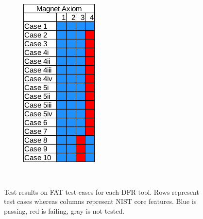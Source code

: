 \begin{figure}[h!]
\begin{subfigure}{0.17\linewidth}
    \end{subfigure}~~
    \begin{subfigure}{0.17\linewidth}
        \includegraphics[width=\linewidth]{fig/axiom_results_fat.png}
    \end{subfigure}~~
        
    \caption{Test results on FAT test cases for each DFR tool. Rows represent test cases whereas columns represent NIST core features. Blue is passing, red is failing, gray is not tested.}
    \label{fig:results_fat}
\end{figure}


